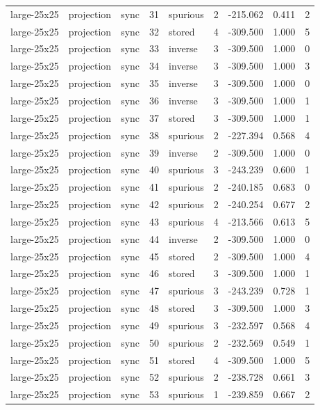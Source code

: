 \begin{tabular}{lllrlrrrr}
large-25x25 & projection & sync & 31 & spurious & 2 & -215.062 & 0.411 & 2 \\
large-25x25 & projection & sync & 32 & stored & 4 & -309.500 & 1.000 & 5 \\
large-25x25 & projection & sync & 33 & inverse & 3 & -309.500 & 1.000 & 0 \\
large-25x25 & projection & sync & 34 & inverse & 3 & -309.500 & 1.000 & 3 \\
large-25x25 & projection & sync & 35 & inverse & 3 & -309.500 & 1.000 & 0 \\
large-25x25 & projection & sync & 36 & inverse & 3 & -309.500 & 1.000 & 1 \\
large-25x25 & projection & sync & 37 & stored & 3 & -309.500 & 1.000 & 1 \\
large-25x25 & projection & sync & 38 & spurious & 2 & -227.394 & 0.568 & 4 \\
large-25x25 & projection & sync & 39 & inverse & 2 & -309.500 & 1.000 & 0 \\
large-25x25 & projection & sync & 40 & spurious & 3 & -243.239 & 0.600 & 1 \\
large-25x25 & projection & sync & 41 & spurious & 2 & -240.185 & 0.683 & 0 \\
large-25x25 & projection & sync & 42 & spurious & 2 & -240.254 & 0.677 & 2 \\
large-25x25 & projection & sync & 43 & spurious & 4 & -213.566 & 0.613 & 5 \\
large-25x25 & projection & sync & 44 & inverse & 2 & -309.500 & 1.000 & 0 \\
large-25x25 & projection & sync & 45 & stored & 2 & -309.500 & 1.000 & 4 \\
large-25x25 & projection & sync & 46 & stored & 3 & -309.500 & 1.000 & 1 \\
large-25x25 & projection & sync & 47 & spurious & 3 & -243.239 & 0.728 & 1 \\
large-25x25 & projection & sync & 48 & stored & 3 & -309.500 & 1.000 & 3 \\
large-25x25 & projection & sync & 49 & spurious & 3 & -232.597 & 0.568 & 4 \\
large-25x25 & projection & sync & 50 & spurious & 2 & -232.569 & 0.549 & 1 \\
large-25x25 & projection & sync & 51 & stored & 4 & -309.500 & 1.000 & 5 \\
large-25x25 & projection & sync & 52 & spurious & 2 & -238.728 & 0.661 & 3 \\
large-25x25 & projection & sync & 53 & spurious & 1 & -239.859 & 0.667 & 2 \\

\end{tabular}
